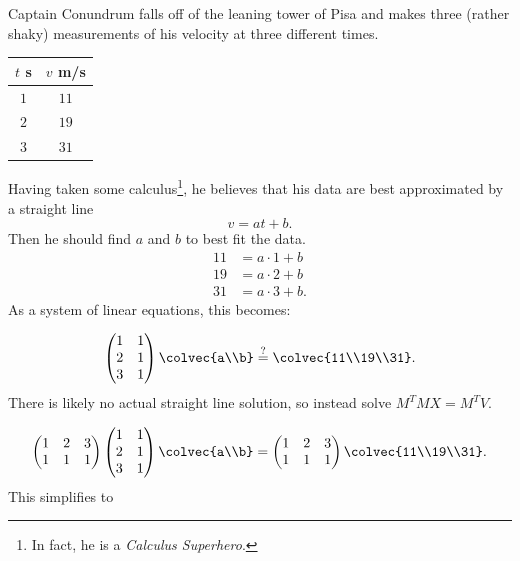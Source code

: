 \begin{example}
Captain Conundrum falls off of the leaning tower of Pisa and makes three (rather shaky) measurements of his velocity at three different times.

\begin{center}
\begin{tabular}{c|c}
$t$ s & $v $ m/s \\ \hline
$1$ & $11$ \\
$2$ & $19$ \\
$3$ & $31$
\end{tabular}
\end{center}

Having taken some calculus\footnote{In fact, he is a \emph{Calculus Superhero}.}, he believes that his data are best approximated by a straight line
\[
v = at+b.
\]
Then he should find $a$ and $b$ to best fit the data.
\begin{align*}
11 &= a\cdot 1 + b \\
19 &= a\cdot 2 + b \\
31 &= a\cdot 3 + b.
\end{align*}
As a system of linear equations, this becomes:

\[
\begin{pmatrix}
1 & 1 \\
2 & 1 \\
3 & 1 \\
\end{pmatrix}
\colvec{a\\b} \stackrel{?}{=}
\colvec{11\\19\\31}.
\]
There is likely no actual straight line solution, so instead solve $M^TMX=M^TV$.

\[
\begin{pmatrix}
1 & 2 & 3 \\
1 & 1 & 1 \\
\end{pmatrix}
\begin{pmatrix}
1 & 1 \\
2 & 1 \\
3 & 1 \\
\end{pmatrix} \colvec{a\\b}
= 
\begin{pmatrix}
1 & 2 & 3 \\
1 & 1 & 1 \\
\end{pmatrix}
\colvec{11\\19\\31}.
\]
This simplifies to 


\end{example}
